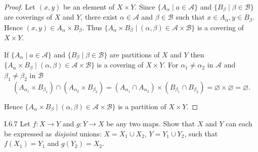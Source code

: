 \begin{proof}
	Let \( (x, y) \) be an element of \( X\times Y \). Since \( \{ A_{\alpha} \mid a \in \mathscr{A} \} \) and \(\{B_{\beta} \mid \beta \in \mathscr{B}\}\) are coverings of \( X \) and \( Y \), there exist \( \alpha \in \mathscr{A} \) and \( \beta \in \mathscr{B} \) such that \( x \in A_{\alpha}, y \in B_{\beta} \). Hence \( (x, y) \in A_{\alpha} \times B_{\beta} \). Thus \(\{A_{\alpha} \times B_{\beta} \mid (\alpha, \beta) \in \mathscr{A} \times \mathscr{B}\}\) is a covering of \(X \times Y\).

	If \( \{ A_{\alpha} \mid a \in \mathscr{A} \} \) and \(\{B_{\beta} \mid \beta \in \mathscr{B}\}\) are partitions of \( X \) and \( Y \) then \(\{A_{\alpha} \times B_{\beta} \mid (\alpha, \beta) \in \mathscr{A} \times \mathscr{B}\}\) is a covering of \(X \times Y\). For \( \alpha_{1} \ne \alpha_{2} \) in \( \mathscr{A} \) and \( \beta_{1} \ne \beta_{2} \) in \( \mathscr{B} \)
	\[
		(A_{\alpha_{1}} \times B_{\beta_{1}}) \cap (A_{\alpha_{2}} \times B_{\beta_{2}}) = (A_{\alpha_{1}} \cap A_{\alpha_{2}}) \times (B_{\beta_{1}} \cap B_{\beta_{2}}) = \varnothing \times \varnothing = \varnothing.
	\]

	Hence \(\{A_{\alpha} \times B_{\beta} \mid (\alpha, \beta) \in \mathscr{A} \times \mathscr{B}\}\) is a partition of \(X \times Y\).
\end{proof}

\begin{problem}{I.6.7}
Let \(f : X \to Y\) and \(g : Y \to X\) be any two maps. Show that \(X\) and \(Y\) can each be expressed as \textit{disjoint} unions: \(X = X_{1} \cup X_{2}\), \(Y = Y_{1} \cup Y_{2}\), such that \(f(X_{1}) = Y_{1}\) and \(g(Y_{2}) = X_{2}\).
\end{problem}

